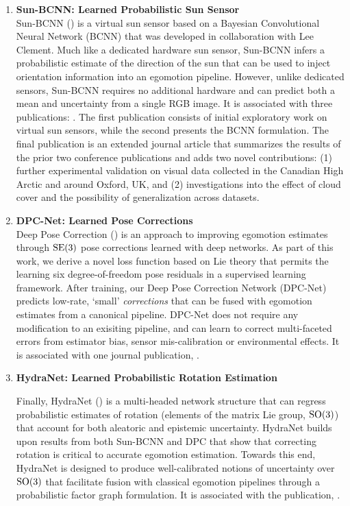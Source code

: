 \begin{enumerate}
\item \textbf{Sun-BCNN: Learned Probabilistic Sun Sensor} \\ 
Sun-BCNN () is a virtual sun sensor based on a Bayesian Convolutional Neural Network (BCNN) that was developed in collaboration with Lee Clement. Much like a dedicated hardware sun sensor, Sun-BCNN infers a probabilistic estimate of the direction of the sun that can be used to inject orientation information into an egomotion pipeline. However, unlike dedicated sensors, Sun-BCNN requires no additional hardware and can predict both a mean and uncertainty from a single RGB image. It is associated with three publications: \cite{2017_Clement_Improving,2017_Peretroukhin_Reducing,2018_Peretroukhin_Inferring}. The first publication consists of initial exploratory work on virtual sun sensors, while the second presents the BCNN formulation. The final publication is an extended journal article that summarizes the results of the prior two conference publications and adds two novel contributions: (1) further experimental validation on visual data collected in the Canadian High Arctic and around Oxford, UK, and (2) investigations into the effect of cloud cover and the possibility of generalization across datasets. 


\item \textbf{DPC-Net: Learned Pose Corrections} \\
Deep Pose Correction () is an approach to improving egomotion estimates through $\mathrm{SE}(3)$ pose corrections learned with deep networks. As part of this work, we derive a novel loss function based on Lie theory that permits the learning six degree-of-freedom pose residuals in a supervised learning framework. After training, our Deep Pose Correction Network (DPC-Net) predicts low-rate, `small' \textit{corrections} that can be fused with egomotion estimates from a canonical pipeline. DPC-Net does not require any modification to an exisiting pipeline, and can learn to correct multi-faceted errors from estimator bias, sensor mis-calibration or environmental effects. It is associated with one journal publication, \cite{2018_Peretroukhin_Deep}.

\item \textbf{HydraNet: Learned Probabilistic Rotation Estimation}

Finally, HydraNet () is a multi-headed network structure that can regress probabilistic estimates of rotation (elements of the matrix Lie group, $\mathrm{SO}(3)$) that account for both aleatoric and epistemic uncertainty. HydraNet builds upon results from both Sun-BCNN and DPC that show that correcting rotation is critical to accurate egomotion estimation.  Towards this end, HydraNet is designed to produce well-calibrated notions of uncertainty over $\mathrm{SO}(3)$  that facilitate fusion with classical egomotion pipelines through a probabilistic factor graph formulation. It is associated with the publication, \cite{2019_Peretroukhin_Deep}.

\end{enumerate}

